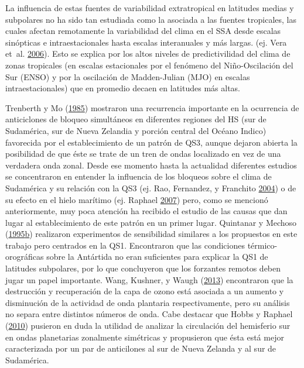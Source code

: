 \documentclass[spanish,a4paper,12p]{book}
\begin{document}
La influencia de estas fuentes de variabilidad extratropical en
latitudes medias y subpolares no ha sido tan estudiada como la asociada
a las fuentes tropicales, las cuales afectan remotamente la variabilidad
del clima en el SSA desde escalas sinópticas e intraestacionales hasta
escalas interanuales y más largas. (ej. Vera et~al.
\protect\hyperlink{ref-Vera2006}{2006}). Esto se explica por los altos
niveles de predictivilidad del clima de zonas tropicales (en escalas
estacionales por el fenómeno del Niño-Oscilación del Sur (ENSO) y por la
oscilación de Madden-Julian (MJO) en escalas intraestacionales) que en
promedio decaen en latitudes más altas.

Trenberth y Mo (\protect\hyperlink{ref-Trenberth1985}{1985}) mostraron
una recurrencia importante en la ocurrencia de anticiclones de bloqueo
simultáneos en diferentes regiones del HS (sur de Sudamérica, sur de
Nueva Zelandia y porción central del Océano Indico) favorecida por el
establecimiento de un patrón de QS3, aunque dejaron abierta la
posibilidad de que éste se trate de un tren de ondas localizado en vez
de una verdadera onda zonal. Desde ese momento hasta la actualidad
diferentes estudios se concentraron en entender la influencia de los
bloqueos sobre el clima de Sudamérica y su relación con la QS3 (ej. Rao,
Fernandez, y Franchito \protect\hyperlink{ref-Rao2004}{2004}) o de su
efecto en el hielo marítimo (ej. Raphael
\protect\hyperlink{ref-Raphael2007a}{2007}) pero, como se mencionó
anteriormente, muy poca atención ha recibido el estudio de las causas
que dan lugar al establecimiento de este patrón en un primer lugar.
Quintanar y Mechoso
(\protect\hyperlink{ref-Quintanar1995}{1995}\protect\hyperlink{ref-Quintanar1995}{b})
realizaron experimentos de sensibilidad similares a los propuestos en
este trabajo pero centrados en la QS1. Encontraron que las condiciones
térmico-orográficas sobre la Antártida no eran suficientes para explicar
la QS1 de latitudes subpolares, por lo que concluyeron que los forzantes
remotos deben jugar un papel importante. Wang, Kushner, y Waugh
(\protect\hyperlink{ref-Wang2013}{2013}) encontraron que la destrucción
y recuperación de la capa de ozono está asociada a un aumento y
disminución de la actividad de onda plantaria respectivamente, pero su
análisis no separa entre distintos números de onda. Cabe destacar que
Hobbs y Raphael (\protect\hyperlink{ref-Hobbs2010}{2010}) pusieron en
duda la utilidad de analizar la circulación del hemisferio sur en ondas
planetarias zonalmente simétricas y propusieron que ésta está mejor
caracterizada por un par de anticilones al sur de Nueva Zelanda y al sur
de Sudamérica.
\end{document}
